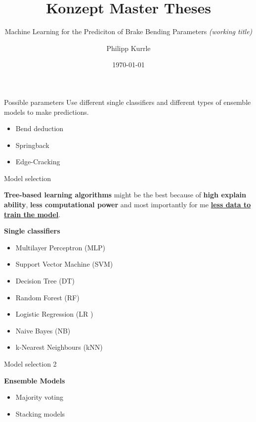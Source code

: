 \documentclass{beamer}
\title{Konzept Master Theses}
\subtitle{Machine Learning for the Prediciton of Brake Bending Parameters \emph{(working title)}}
\author{Philipp Kurrle}
\institute{HfT Stuttgart}
\date{\today}
\begin{document}
\begin{frame}
    \titlepage
\end{frame}

\begin{frame}{Possible parameters}
Use different single classifiers and different types of ensemble models to make predictions. \\

\vspace{0.5cm}

\begin{itemize}
    \item Bend deduction
    \item Springback
    \item Edge-Cracking
\end{itemize}
\end{frame}

\begin{frame}{Model selection}

\textbf{Tree-based learning algorithms} might be the best because of 
\textbf{high explain ability}, \textbf{less computational power} and most importantly for me \textbf{\underline{less data to train the model}}.

\vspace{0.5cm}

\textbf{Single classifiers}
\begin{itemize}
        \item Multilayer Perceptron (MLP)
        \item Support Vector Machine (SVM)
        \item Decision Tree (DT) 
        \item Random Forest (RF)
        \item Logistic Regression (LR )
        \item Naive Bayes (NB) 
        \item k-Nearest Neighbours (kNN)
\end{itemize}    

\end{frame}


\begin{frame}{Model selection 2}

\textbf{Ensemble Models}
\begin{itemize}
        \item Majority voting
        \item Stacking models
    \end{itemize}
    
\end{frame}
\end{document}
